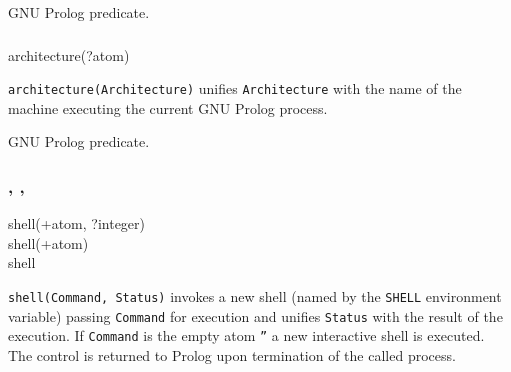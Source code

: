 \Portability

GNU Prolog predicate.

\subsubsection{}

\begin{TemplatesOneCol}
architecture(?atom)

\end{TemplatesOneCol}

\Description

\texttt{architecture(Architecture)} unifies \texttt{Architecture} with the
name of the machine executing the current GNU Prolog process.

\begin{PlErrors}



\end{PlErrors}

\Portability

GNU Prolog predicate.

\subsubsection{,
               ,
               }

\begin{TemplatesOneCol}
shell(+atom, ?integer)\\
shell(+atom)\\
shell

\end{TemplatesOneCol}

\Description

\texttt{shell(Command, Status)} invokes a new shell (named by the
\texttt{SHELL} environment variable) passing \texttt{Command} for execution
and unifies \texttt{Status} with the result of the execution. If
\texttt{Command} is the empty atom \texttt{''} a new interactive shell is
executed. The control is returned to Prolog upon termination of the called
process.

